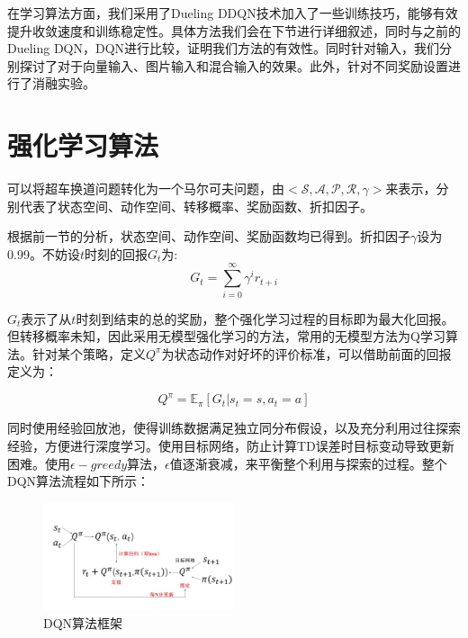 \documentclass[letterpaper, 10 pt, conference]{ieeeconf}  %
\begin{document}
在学习算法方面，我们采用了Dueling DDQN技术加入了一些训练技巧，能够有效提升收敛速度和训练稳定性。具体方法我们会在下节进行详细叙述，同时与之前的Dueling DQN，DQN进行比较，证明我们方法的有效性。同时针对输入，我们分别探讨了对于向量输入、图片输入和混合输入的效果。此外，针对不同奖励设置进行了消融实验。

\section{强化学习算法}
可以将超车换道问题转化为一个马尔可夫问题，由$<\mathcal{S},\mathcal{A},\mathcal{P},\mathcal{R},\gamma>$来表示，分别代表了状态空间、动作空间、转移概率、奖励函数、折扣因子。

根据前一节的分析，状态空间、动作空间、奖励函数均已得到。折扣因子$\gamma$设为0.99。不妨设$t$时刻的回报$G_t$为:
\begin{equation}
    G_t = \sum^{\infty}_{i=0}\gamma^ir_{t+i}
\end{equation}

$G_t$表示了从$t$时刻到结束的总的奖励，整个强化学习过程的目标即为最大化回报。但转移概率未知，因此采用无模型强化学习的方法，常用的无模型方法为Q学习算法。针对某个策略，定义$Q^\pi$为状态动作对好坏的评价标准，可以借助前面的回报定义为：

\begin{equation}
    Q^\pi = \mathbb{E}_\pi[G_t|s_t=s,a_t=a]
\end{equation}

同时使用经验回放池，使得训练数据满足独立同分布假设，以及充分利用过往探索经验，方便进行深度学习。使用目标网络，防止计算TD误差时目标变动导致更新困难。使用$\epsilon-greedy$算法，$\epsilon$值逐渐衰减，来平衡整个利用与探索的过程。整个DQN算法流程如下所示：

\begin{figure}[htbp] %
    \centering %
    \includegraphics[width=0.5\textwidth]{fig/2.JPG} %
    \caption{DQN算法框架} %
    \label{Fig.main2} %
\end{figure}
\end{document}
